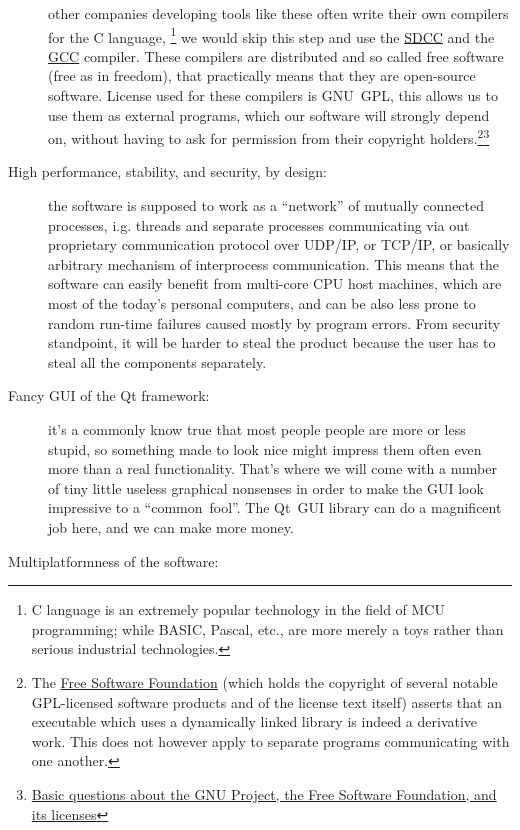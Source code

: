 \documentclass[a4paper,twoside,15pt]{book}
\begin{document}
\begin{description}
					other companies developing tools like these often write their own compilers for the C language, \footnote{C language is an extremely popular technology in the field of MCU programming; while BASIC, Pascal, etc., are more merely a toys rather than serious industrial technologies.} we would skip this step and use the \href{http://en.wikipedia.org/wiki/Small_Device_C_Compiler}{SDCC} and the \href{http://en.wikipedia.org/wiki/GNU_Compiler_Collection}{GCC} compiler. These compilers are distributed and so called free software (free as in freedom), that practically means that they are open-source software. License used for these compilers is GNU~GPL, this allows us to use them as external programs, which our software will strongly depend on, without having to ask for permission from their copyright holders.\footnote{The \href{http://en.wikipedia.org/wiki/Free_Software_Foundation}{Free Software Foundation} (which holds the copyright of several notable GPL-licensed software products and of the license text itself) asserts that an executable which uses a dynamically linked library is indeed a derivative work. This does not however apply to separate programs communicating with one another.}\footnote{\href{http://www.gnu.org/licenses/gpl-faq.html\#NFUseGPLPlugins}{Basic questions about the GNU Project, the Free Software Foundation, and its licenses}}
				\item[High performance, stability, and security, by design:]
					the software is supposed to work as a ``network'' of mutually connected processes, i.g. threads and separate processes communicating via out proprietary communication protocol over UDP/IP, or TCP/IP, or basically arbitrary mechanism of interprocess communication. This means that the software can easily benefit from multi-core CPU host machines, which are most of the today's personal computers, and can be also less prone to random run-time failures caused mostly by program errors. From security standpoint, it will be harder to steal the product because the user has to steal all the components separately.
				\item[Fancy GUI of the Qt framework:]
					it's a commonly know true that most people people are more or less stupid, so something made to look nice might impress them often even more than a real functionality. That's where we will come with a number of tiny little useless graphical nonsenses in order to make the GUI look impressive to a ``common~fool''. The Qt~GUI library can do a magnificent job here, and we can make more money.
				\item[Multiplatformness of the software:]

\end{description}
\end{document}
